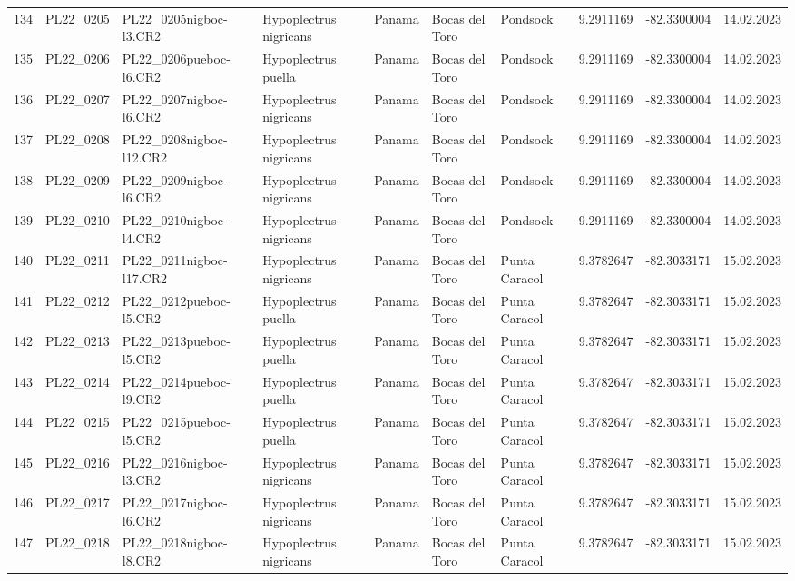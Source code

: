 \begin{table}[ht]
\begin{tabular}{rlllllllll}
  134 & PL22\_0205 & PL22\_0205nigboc-l3.CR2 & Hypoplectrus nigricans  & Panama & Bocas del Toro & Pondsock & 9.2911169 & -82.3300004 & 14.02.2023 \\ 
  135 & PL22\_0206 & PL22\_0206pueboc-l6.CR2 & Hypoplectrus puella & Panama & Bocas del Toro & Pondsock & 9.2911169 & -82.3300004 & 14.02.2023 \\ 
  136 & PL22\_0207 & PL22\_0207nigboc-l6.CR2 & Hypoplectrus nigricans  & Panama & Bocas del Toro & Pondsock & 9.2911169 & -82.3300004 & 14.02.2023 \\ 
  137 & PL22\_0208 & PL22\_0208nigboc-l12.CR2 & Hypoplectrus nigricans  & Panama & Bocas del Toro & Pondsock & 9.2911169 & -82.3300004 & 14.02.2023 \\ 
  138 & PL22\_0209 & PL22\_0209nigboc-l6.CR2 & Hypoplectrus nigricans  & Panama & Bocas del Toro & Pondsock & 9.2911169 & -82.3300004 & 14.02.2023 \\ 
  139 & PL22\_0210 & PL22\_0210nigboc-l4.CR2 & Hypoplectrus nigricans  & Panama & Bocas del Toro & Pondsock & 9.2911169 & -82.3300004 & 14.02.2023 \\ 
  140 & PL22\_0211 & PL22\_0211nigboc-l17.CR2 & Hypoplectrus nigricans  & Panama & Bocas del Toro & Punta Caracol & 9.3782647 & -82.3033171 & 15.02.2023 \\ 
  141 & PL22\_0212 & PL22\_0212pueboc-l5.CR2 & Hypoplectrus puella & Panama & Bocas del Toro & Punta Caracol & 9.3782647 & -82.3033171 & 15.02.2023 \\ 
  142 & PL22\_0213 & PL22\_0213pueboc-l5.CR2 & Hypoplectrus puella & Panama & Bocas del Toro & Punta Caracol & 9.3782647 & -82.3033171 & 15.02.2023 \\ 
  143 & PL22\_0214 & PL22\_0214pueboc-l9.CR2 & Hypoplectrus puella & Panama & Bocas del Toro & Punta Caracol & 9.3782647 & -82.3033171 & 15.02.2023 \\ 
  144 & PL22\_0215 & PL22\_0215pueboc-l5.CR2 & Hypoplectrus puella & Panama & Bocas del Toro & Punta Caracol & 9.3782647 & -82.3033171 & 15.02.2023 \\ 
  145 & PL22\_0216 & PL22\_0216nigboc-l3.CR2 & Hypoplectrus nigricans  & Panama & Bocas del Toro & Punta Caracol & 9.3782647 & -82.3033171 & 15.02.2023 \\ 
  146 & PL22\_0217 & PL22\_0217nigboc-l6.CR2 & Hypoplectrus nigricans  & Panama & Bocas del Toro & Punta Caracol & 9.3782647 & -82.3033171 & 15.02.2023 \\ 
  147 & PL22\_0218 & PL22\_0218nigboc-l8.CR2 & Hypoplectrus nigricans  & Panama & Bocas del Toro & Punta Caracol & 9.3782647 & -82.3033171 & 15.02.2023 \\ 

\end{tabular}
\end{table}
